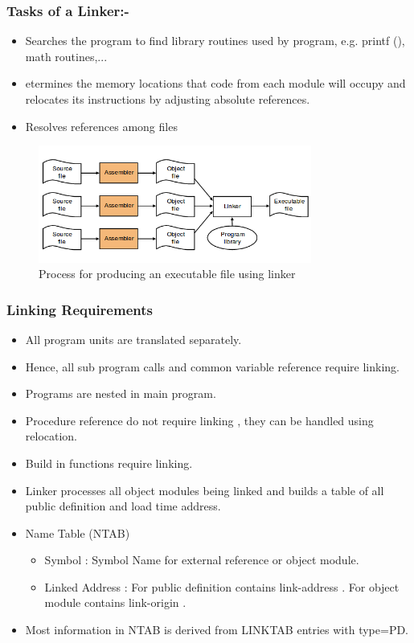 \documentclass[12pt]{article}
\begin{document}
\subsubsection{Tasks of a Linker:-}
\begin{itemize}
  \item Searches the program to find library routines used by 
program, e.g. 
printf
(), math routines,...
  \item etermines the memory locations that code from each 
module will occupy and relocates its instructions by 
adjusting absolute references.\item Resolves references among files
\end{itemize}

\begin{figure}[H]
\centering
\includegraphics[width=0.8\textwidth]{linker.png}
\caption{\label{fig:linker} Process for producing an executable file using linker}
\end{figure}
\subsubsection{Linking Requirements}
\begin{itemize}
  \item All program units are translated separately.
  \item Hence, all 
sub program calls  and common variable 
reference require linking. \item Programs are 
nested
in main program. \item Procedure reference do not require linking
, they can be 
handled using 
relocation.\item Build in functions require linking. \item Linker processes all object modules being linked and builds a 
table of all public definition and load time address. \item Name Table (NTAB)  \begin{itemize}
  \item  
Symbol
: Symbol Name for external reference or object 
module.
  \item 
Linked Address
: For public definition contains 
link-address
. 
For object  module  contains 
link-origin
.
\end{itemize}  \item Most information in NTAB is derived from LINKTAB entries 
with type=PD.
\end{itemize}
\end{document}
